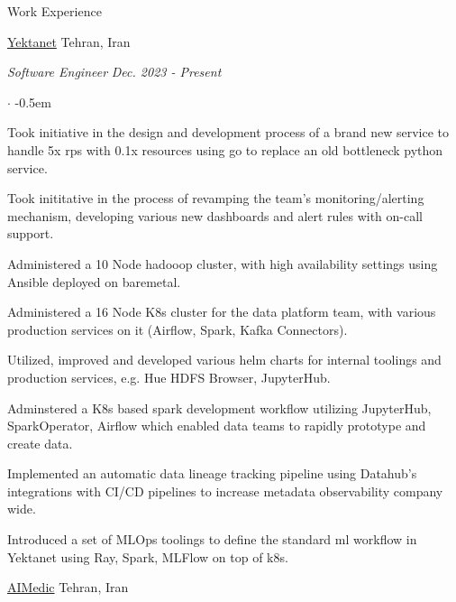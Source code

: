 \documentclass[../professional-cv.tex]{subfiles}
\begin{document}
\begin{rSection}{Work Experience}
	\begin{rWorkSection}
		{\href{https://yektanet.com/}{Yektanet}}
		{Tehran, Iran}

		\vspace{-1em}
		{\em Software Engineer} \hfill {\em Dec. 2023 - Present} \hspace{10pt}
		\normalfont
		\begin{list}{$\cdot$}{\leftmargin=10pt\normalfont \rightmargin=20pt}
			\itemsep -0.5em
			\item Took initiative in the design and development process of a brand new service to handle 5x rps with 0.1x resources using go to replace an old bottleneck python service.
			\item Took inititative in the process of revamping the team's monitoring/alerting mechanism, developing various new dashboards and alert rules with on-call support.
			\item Administered a 10 Node hadooop cluster, with high availability settings using Ansible deployed on baremetal.
			\item Administered a 16 Node K8s cluster for the data platform team, with various production services on it (Airflow, Spark, Kafka Connectors).
			\item Utilized, improved and developed various helm charts for internal toolings and production services, e.g. Hue HDFS Browser, JupyterHub.
			\item Adminstered a K8s based spark development workflow utilizing JupyterHub, SparkOperator, Airflow which enabled data teams to rapidly prototype and create data.
			\item Implemented an automatic data lineage tracking pipeline using Datahub's integrations with CI/CD pipelines to increase metadata observability company wide.
			\item Introduced a set of MLOps toolings to define the standard ml workflow in Yektanet using Ray, Spark, MLFlow on top of k8s.
		\end{list}
	\end{rWorkSection}

	\begin{rWorkSection}
		{\href{https://aimedic.co/}{AIMedic}}
		{Tehran, Iran}


\end{rWorkSection}
\end{rSection}
\end{document}

